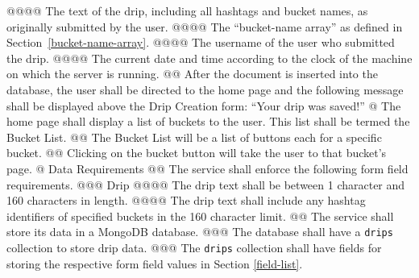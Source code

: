 \documentclass{article}
\begin{document}
\begin{easylist}[articletoc]
@@@@ The text of the drip, including all hashtags and bucket names, as originally submitted by the user.
@@@@ The ``bucket-name array'' as defined in Section~\ref{bucket-name-array}.
@@@@ The username of the user who submitted the drip.
@@@@ The current date and time according to the clock of the machine on which the server is running.
@@ After the document is inserted into the database, the user shall be directed to the home page and the following message shall be displayed above the Drip Creation form: ``Your drip was saved!''
@ The home page shall display a list of buckets to the user. This list shall be termed the Bucket List.
@@ The Bucket List will be a list of buttons each for a specific bucket.
@@ Clicking on the bucket button will take the user to that bucket’s page.
@ Data Requirements
@@ The service shall enforce the following form field requirements.
@@@ Drip
@@@@ The drip text shall be between 1 character and 160 characters in length.
@@@@ The drip text shall include any hashtag identifiers of specified buckets in the 160 character limit.
@@ The service shall store its data in a MongoDB database.
@@@ The database shall have a \texttt{drips} collection to store drip data.
@@@ The \texttt{drips} collection shall have fields for storing the respective form field values in Section \ref{field-list}.

\end{easylist}
\end{document}
